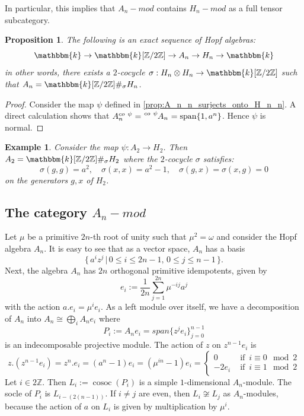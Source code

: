 \documentclass{amsart}
\theoremstyle{plain}%
\newtheorem{prop}[lemma]{Proposition}
\newtheorem{example}[lemma]{Example}
\theoremstyle{remark}
\newcommand{\1}{\mathbbm{1}}
\newcommand{\Z}{\mathbb{Z}}
\newcommand{\kk}{\mathbbm{k}}
\newcommand{\prescr}[2]{\tensor*[^{#1}]{#2}{}}
\begin{document}
        In particular, this implies that $A_n-mod$ contains $H_n-mod$ as a full tensor subcategory.

        \begin{prop}\label{prop: A_n is a crossed product}
            The following is an exact sequence of Hopf algebras:
            $$
                \kk \to \kk[\Z/2\Z]\to A_n\to H_n\to \kk
            $$
            in other words, there exists a $2$-cocycle $\sigma:H_n\otimes H_n \to \kk[\Z/2\Z]$ such that $A_n = \kk[\Z/2\Z]\#_\sigma H_n$.            
        \end{prop}
        \begin{proof}
            Consider the map $\psi$ defined in \cref{prop:A_n_n_surjects_onto_H_n_n}. A direct calculation shows that $A_n^{co~ \psi} = \prescr{co~ \psi}{{A_n}} = \mathrm{span}\{1,a^n\}$. Hence $\psi$ is normal.             
        \end{proof}
    \begin{example}
        Consider the map $\psi:A_2\to H_2$. Then $A_2 = \kk[\Z/2\Z]\#_\sigma H_2$ where the $2$-cocycle $\sigma$ satisfies:
        $$
            \sigma(g,g) = a^2,\quad \sigma(x,x) = a^2-1,\quad \sigma(g,x)=\sigma(x,g)=0
        $$
        on the generators $g,x$ of $H_2$.
    \end{example}
    \subsection{The category \texorpdfstring{$A_n-mod$}{An-mod}}
    Let $\mu$ be a primitive $2n$-th root of unity such that $\mu^2 = \omega$ and consider the Hopf algebra $A_n$. It is easy to see that as a vector space, $A_n$ has a basis $$\{\,a^iz^j\,|\,0\le i\le 2n-1,\, 0\le j\le n-1\,\}.$$ 
 Next, the algebra $A_n$ 
        has $2n$ orthogonal primitive idempotents, given by 
        $$
            e_i := \frac{1}{2n}\sum_{j=1}^{2n}\mu^{-ij}a^j
        $$
        with the action $a.e_i = \mu^i e_i$. As a left module over itself, we have a decomposition of $A_n$ into $A_n\cong \bigoplus_i A_ne_i$ where  $$P_i:=A_ne_i = span\{z^je_i\}_{j=0}^{n-1}$$ is an indecomposable projective module. The action of $z$ on $z^{n-1}e_i$ is 
        $$
            z. (z^{n-1}e_i) = z^n. e_i = (a^n-1)e_i = (\mu^{in}-1)e_i = \begin{cases}
            0 & \text{ if }\, i\equiv 0\mod 2\\ -2e_i & \text{ if }\, i\equiv 1\mod 2
            \end{cases}
        $$
        Let $i\in 2\Z$. Then $L_{i} := \operatorname{cosoc}(P_i)$ is a  simple $1$-dimensional $A_{n}$-module. The socle of $P_i$ is $L_{i-(2(n-1))}$. If $i\ne{j}$ are even, then $L_i\not\cong L_j$ as $A_{n}$-modules, because the action of $a$ on $L_i$ is given by multiplication by $\mu^i$. 
\end{document}
